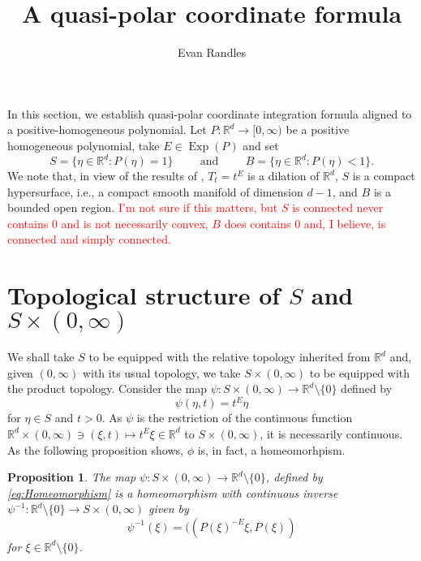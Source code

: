 \documentclass{article}
\author{Evan Randles}
\title{A quasi-polar coordinate formula}
\date{}
\theoremstyle{theorem}
\newtheorem{proposition}[theorem]{Proposition}
\theoremstyle{remark}
\newcommand\Exp{\operatorname{Exp}}
\begin{document}
\maketitle

In this section, we establish quasi-polar coordinate integration formula aligned to a positive-homogeneous polynomial. Let $P:\mathbb{R}^d\to [0,\infty)$ be a positive homogeneous polynomial, take $E\in\Exp(P)$ and set
\begin{equation*}
S=\{\eta\in\mathbb{R}^d: P(\eta)=1\}\hspace{1cm}\mbox{and}\hspace{1cm}B=\{\eta\in\mathbb{R}^d:P(\eta)<1\}.
\end{equation*}
We note that, in view of the results of \cite{Randles2017}, $T_t=t^E$ is a dilation of $\mathbb{R}^d$, $S$ is a compact hypersurface, i.e., a compact smooth manifold of dimension $d-1$, and $B$ is a bounded open region. \textcolor{red}{I'm not sure if this matters, but $S$ is connected never contains $0$ and is not necessarily convex, $B$ does contains $0$ and, I believe, is connected and simply connected.} 

\section{Topological structure of $S$ and $S\times (0,\infty)$}

We shall take $S$ to be equipped with the relative topology inherited from $\mathbb{R}^d$ and, given $(0,\infty)$ with its usual topology, we take $S\times (0,\infty)$ to be equipped with the product topology. Consider the map $\psi:S\times (0,\infty)\to\mathbb{R}^d\setminus\{0\}$ defined by
\begin{equation}\label{eq:Homeomorphism}
\psi(\eta,t)=t^E\eta
\end{equation}
for $\eta\in S$ and $t>0$. As $\psi$ is the restriction of the continuous function $\mathbb{R}^d\times (0,\infty)\ni (\xi,t)\mapsto t^E\xi\in\mathbb{R}^d$ to $S\times (0,\infty)$, it is necessarily continuous. As the following proposition shows, $\phi$ is, in fact, a homeomorhpism.

\begin{proposition}
The map $\psi:S\times (0,\infty)\to\mathbb{R}^d\setminus\{0\}$, defined by \eqref{eq:Homeomorphism} is a homeomorphism with continuous inverse $\psi^{-1}:\mathbb{R}^d\setminus\{0\}\to S\times (0,\infty)$ given by
\begin{equation*}
\psi^{-1}(\xi)=((P(\xi)^{-E}\xi,P(\xi))
\end{equation*}
for $\xi\in\mathbb{R}^d\setminus\{0\}$.
\end{proposition}
\end{document}
